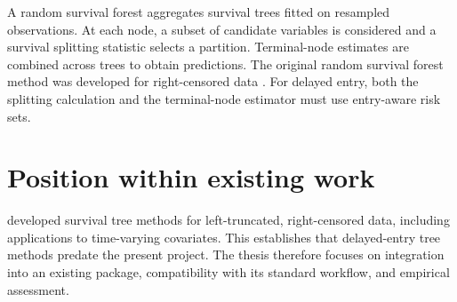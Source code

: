A random survival forest aggregates survival trees fitted on resampled
observations. At each node, a subset of candidate variables is considered and
a survival splitting statistic selects a partition. Terminal-node estimates
are combined across trees to obtain predictions. The original random survival
forest method was developed for right-censored data \citep{ishwaran2008}.
For delayed entry, both the splitting calculation and the terminal-node
estimator must use entry-aware risk sets.

\section{Position within existing work}
\citet{fu2017} developed survival tree methods for left-truncated,
right-censored data, including applications to time-varying covariates.
This establishes that delayed-entry tree methods predate the present project.
The thesis therefore focuses on integration into an existing package,
compatibility with its standard workflow, and empirical assessment.

